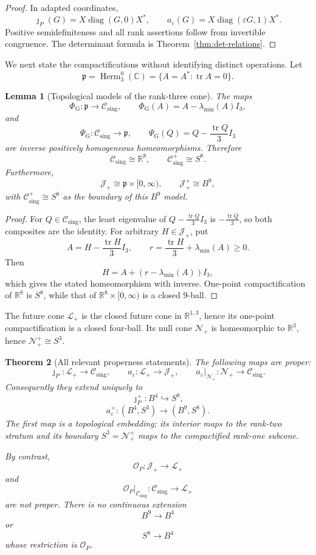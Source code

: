 \documentclass[11pt]{article}
\newtheorem{theorem}{Theorem}[section]
\newtheorem{lemma}[theorem]{Lemma}
\theoremstyle{definition}
\newcommand{\C}{\mathbb C}
\newcommand{\R}{\mathbb R}
\newcommand{\Herm}{\operatorname{Herm}}
\newcommand{\tr}{\operatorname{tr}}
\newcommand{\diag}{\operatorname{diag}}
\newcommand{\Jp}{\mathcal J_+}
\newcommand{\Lp}{\mathcal L_+}
\newcommand{\Np}{\mathcal N_+}
\newcommand{\Cs}{\mathcal C_{\mathrm{sing}}}
\begin{document}
\begin{proof}
In adapted coordinates,
\[
 \jmath_P(G)=X\diag(G,0)X^*,
 \qquad
 a_\varepsilon(G)=X\diag(\varepsilon G,1)X^*.
\]
Positive semidefiniteness and all rank assertions follow from invertible congruence.  The determinant formula is Theorem~\ref{thm:det-relations}.
\end{proof}

We next state the compactifications without identifying distinct operations.  Let
\[
 \mathfrak p=\Herm_3^0(\C)=\{A=A^*: \tr A=0\}.
\]

\begin{lemma}[Topological models of the rank-three cone]\label{lem:topological-models}
The maps
\[
 \Phi_{\mathrm G}:\mathfrak p\longrightarrow\Cs,
 \qquad
 \Phi_{\mathrm G}(A)=A-\lambda_{\min}(A)I_3,
\]
and
\[
 \Psi_{\mathrm G}:\Cs\longrightarrow\mathfrak p,
 \qquad
 \Psi_{\mathrm G}(Q)=Q-\frac{\tr Q}{3}I_3
\]
are inverse positively homogeneous homeomorphisms.  Therefore
\[
 \Cs\cong\R^8,
 \qquad
 \Cs^+\cong S^8.
\]
Furthermore,
\[
 \Jp\cong\mathfrak p\times[0,\infty),
 \qquad
 \Jp^+\cong B^9,
\]
with $\Cs^+\cong S^8$ as the boundary of this $B^9$ model.
\end{lemma}

\begin{proof}
For $Q\in\Cs$, the least eigenvalue of $Q-\frac{\tr Q}{3}I_3$ is $-\frac{\tr Q}{3}$, so both composites are the identity.  For arbitrary $H\in\Jp$, put
\[
 A=H-\frac{\tr H}{3}I_3,
 \qquad
 r=\frac{\tr H}{3}+\lambda_{\min}(A)\geq0.
\]
Then
\[
 H=A+(r-\lambda_{\min}(A))I_3,
\]
which gives the stated homeomorphism with inverse.  One-point compactification of $\R^8$ is $S^8$, while that of $\R^8\times[0,\infty)$ is a closed $9$-ball.
\end{proof}

The future cone $\Lp$ is the closed future cone in $\R^{1,3}$, hence its one-point compactification is a closed four-ball.  Its null cone $\Np$ is homeomorphic to $\R^3$, hence $\Np^+\cong S^3$.

\begin{theorem}[All relevant properness statements]\label{thm:properness}
The following maps are proper:
\[
 \jmath_P:\Lp\longrightarrow\Cs,
 \qquad
 a_\varepsilon:\Lp\longrightarrow\Jp,
 \qquad
 a_\varepsilon|_{\Np}:\Np\longrightarrow\Cs.
\]
Consequently they extend uniquely to
\[
 \boxed{\jmath_P^+:B^4\hookrightarrow S^8,}
\]
\[
 \boxed{a_\varepsilon^+:(B^4,S^3)\longrightarrow(B^9,S^8).}
\]
The first map is a topological embedding; its interior maps to the rank-two stratum and its boundary $S^3=\Np^+$ maps to the compactified rank-one subcone.

By contrast,
\[
 \mathcal O_P:\Jp\longrightarrow\Lp
\]
and
\[
 \mathcal O_P|_{\Cs}:\Cs\longrightarrow\Lp
\]
are not proper.  There is no continuous extension
\[
 B^9\longrightarrow B^4
\]
or
\[
 S^8\longrightarrow B^4
\]
whose restriction is $\mathcal O_P$.
\end{theorem}
\end{document}
